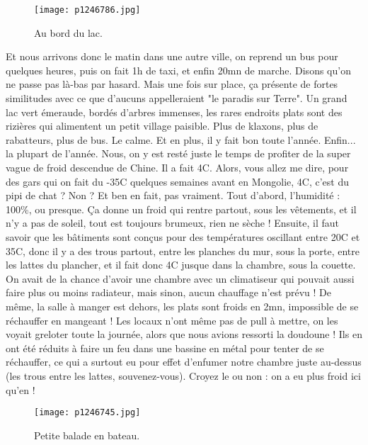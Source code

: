 \documentclass{book}
\begin{document}
\begin{figure}[h]
\centering
\texttt{[image: p1246786.jpg]}
\caption*{Au bord du lac.}
\end{figure}

Et nous arrivons donc le matin dans une autre ville, on reprend un bus pour quelques heures, puis on fait 1h de taxi, et enfin 20mn de marche. Disons qu'on ne passe pas là-bas par hasard. Mais une fois sur place, ça présente de fortes similitudes avec ce que d'aucuns appelleraient "le paradis sur Terre". Un grand lac vert émeraude, bordés d'arbres immenses, les rares endroits plats sont des rizières qui alimentent un petit village paisible. Plus de klaxons, plus de rabatteurs, plus de bus. Le calme. Et en plus, il y fait bon toute l'année. Enfin... la plupart de l'année. Nous, on y est resté juste le temps de profiter de la super vague de froid descendue de Chine. Il a fait 4\textdegree C. Alors, vous allez me dire, pour des gars qui on fait du -35\textdegree C quelques semaines avant en Mongolie, 4\textdegree C, c'est du pipi de chat ? Non ? Et ben en fait, pas vraiment. Tout d'abord, l'humidité : 100\%, ou presque. Ça donne un froid qui rentre partout, sous les vêtements, et il n'y a pas de soleil, tout est toujours brumeux, rien ne sèche ! Ensuite, il faut savoir que les bâtiments sont conçus pour des températures oscillant entre 20\textdegree C et 35\textdegree C, donc il y a des trous partout, entre les planches du mur, sous la porte, entre les lattes du plancher, et il fait donc 4\textdegree C jusque dans la chambre, sous la couette. On avait de la chance d'avoir une chambre avec un climatiseur qui pouvait aussi faire plus ou moins radiateur, mais sinon, aucun chauffage n'est prévu ! De même, la salle à manger est dehors, les plats sont froids en 2mn, impossible de se réchauffer en mangeant ! Les locaux n'ont même pas de pull à mettre, on les voyait greloter toute la journée, alors que nous avions ressorti la doudoune ! Ils en ont été réduits à faire un feu dans une bassine en métal pour tenter de se réchauffer, ce qui a surtout eu pour effet d'enfumer notre chambre juste au-dessus (les trous entre les lattes, souvenez-vous). Croyez le ou non : on a eu plus froid ici qu'en  !




\begin{figure}[h]
\centering
\texttt{[image: p1246745.jpg]}
\caption*{Petite balade en bateau.}
\end{figure}
\end{document}
